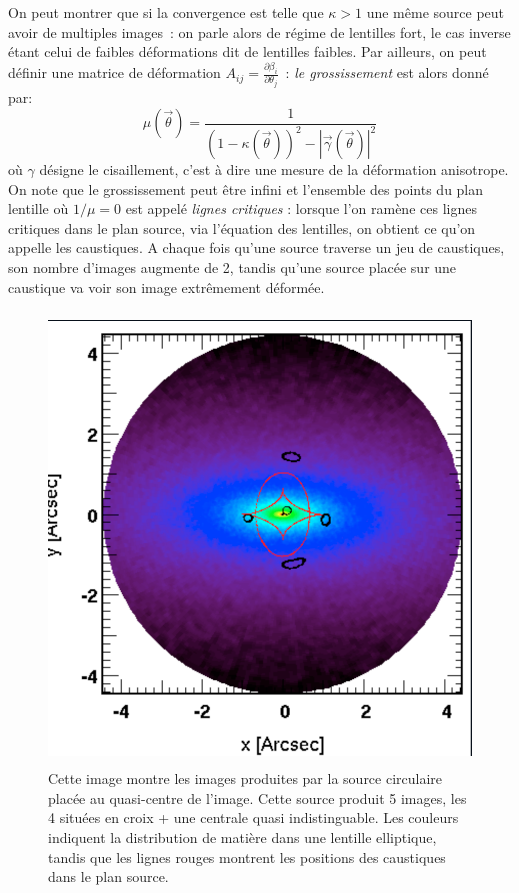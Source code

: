On peut montrer que si la convergence est telle que $\kappa >1$ une même source peut avoir de multiples images~: on parle alors de régime de lentilles fort, le cas inverse étant celui de faibles déformations dit de lentilles faibles. Par ailleurs, on peut définir une matrice de déformation $A_{ij}=\frac{\partial \beta_i}{\partial \theta_j}$~: \textit{le grossissement} est alors donné par:
\begin{equation}
\mu(\vec{\theta})=\frac{1}{(1-\kappa(\vec{\theta}))^2 - |\vec{\gamma}(\vec{\theta})|^2}
\end{equation} 
où $\gamma$ désigne le cisaillement, c'est à dire une mesure de la déformation anisotrope. On note que le grossissement peut être infini et l'ensemble des points du plan lentille où $1/\mu=0$ est appelé \textit{lignes critiques} : lorsque l'on ramène ces lignes critiques dans le plan source, via l'équation des lentilles, on obtient ce qu'on appelle les caustiques. A chaque fois qu'une source traverse un jeu de caustiques, son nombre d'images augmente de 2, tandis qu'une source placée sur une caustique va voir son image extrêmement déformée.

\begin{figure}[htbp]
	\centering
		\includegraphics[height=12cm]{figs/SPL.png}
	\caption[Exemple de calcul de lentilles gravitationnelles]{Cette image montre les images produites par la source circulaire placée au quasi-centre de l'image. Cette source produit 5 images, les 4 situées en croix + une centrale quasi indistinguable. Les couleurs indiquent la distribution de matière dans une lentille elliptique, tandis que les lignes rouges montrent les positions des caustiques dans le plan source.} 
	\label{f:SPL}
\end{figure}

